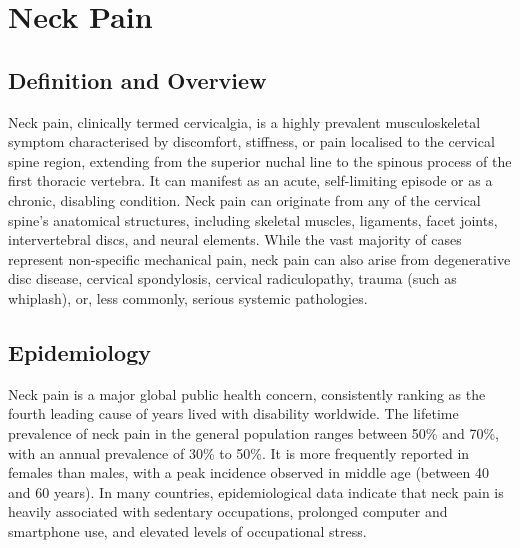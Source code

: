 \chapter{Neck Pain}

\section*{Definition and Overview}
Neck pain, clinically termed cervicalgia, is a highly prevalent musculoskeletal symptom characterised by discomfort, stiffness, or pain localised to the cervical spine region, extending from the superior nuchal line to the spinous process of the first thoracic vertebra. It can manifest as an acute, self-limiting episode or as a chronic, disabling condition. Neck pain can originate from any of the cervical spine's anatomical structures, including skeletal muscles, ligaments, facet joints, intervertebral discs, and neural elements. While the vast majority of cases represent non-specific mechanical pain, neck pain can also arise from degenerative disc disease, cervical spondylosis, cervical radiculopathy, trauma (such as whiplash), or, less commonly, serious systemic pathologies.

\section*{Epidemiology}
Neck pain is a major global public health concern, consistently ranking as the fourth leading cause of years lived with disability worldwide. The lifetime prevalence of neck pain in the general population ranges between 50\% and 70\%, with an annual prevalence of 30\% to 50\%. It is more frequently reported in females than males, with a peak incidence observed in middle age (between 40 and 60 years). In many countries, epidemiological data indicate that neck pain is heavily associated with sedentary occupations, prolonged computer and smartphone use, and elevated levels of occupational stress.

